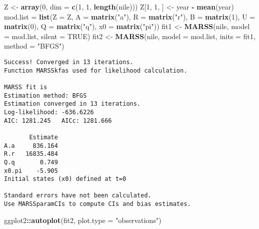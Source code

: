 \documentclass[12pt,]{book}
\newenvironment{Shaded}{\begin{snugshade}}{\end{snugshade}}
\newcommand{\DataTypeTok}[1]{\textcolor[rgb]{0.13,0.29,0.53}{#1}}
\newcommand{\DecValTok}[1]{\textcolor[rgb]{0.00,0.00,0.81}{#1}}
\newcommand{\KeywordTok}[1]{\textcolor[rgb]{0.13,0.29,0.53}{\textbf{#1}}}
\newcommand{\NormalTok}[1]{#1}
\newcommand{\OperatorTok}[1]{\textcolor[rgb]{0.81,0.36,0.00}{\textbf{#1}}}
\newcommand{\OtherTok}[1]{\textcolor[rgb]{0.56,0.35,0.01}{#1}}
\newcommand{\StringTok}[1]{\textcolor[rgb]{0.31,0.60,0.02}{#1}}
\begin{document}
\begin{Shaded}
\begin{Highlighting}[]
\NormalTok{Z <-}\StringTok{ }\KeywordTok{array}\NormalTok{(}\DecValTok{0}\NormalTok{, }\DataTypeTok{dim =} \KeywordTok{c}\NormalTok{(}\DecValTok{1}\NormalTok{, }\DecValTok{1}\NormalTok{, }\KeywordTok{length}\NormalTok{(nile)))}
\NormalTok{Z[}\DecValTok{1}\NormalTok{, }\DecValTok{1}\NormalTok{, ] <-}\StringTok{ }\NormalTok{year }\OperatorTok{-}\StringTok{ }\KeywordTok{mean}\NormalTok{(year)}
\NormalTok{mod.list =}\StringTok{ }\KeywordTok{list}\NormalTok{(}\DataTypeTok{Z =}\NormalTok{ Z, }\DataTypeTok{A =} \KeywordTok{matrix}\NormalTok{(}\StringTok{"a"}\NormalTok{), }\DataTypeTok{R =} \KeywordTok{matrix}\NormalTok{(}\StringTok{"r"}\NormalTok{), }\DataTypeTok{B =} \KeywordTok{matrix}\NormalTok{(}\DecValTok{1}\NormalTok{), }
    \DataTypeTok{U =} \KeywordTok{matrix}\NormalTok{(}\DecValTok{0}\NormalTok{), }\DataTypeTok{Q =} \KeywordTok{matrix}\NormalTok{(}\StringTok{"q"}\NormalTok{), }\DataTypeTok{x0 =} \KeywordTok{matrix}\NormalTok{(}\StringTok{"pi"}\NormalTok{))}
\NormalTok{fit1 <-}\StringTok{ }\KeywordTok{MARSS}\NormalTok{(nile, }\DataTypeTok{model =}\NormalTok{ mod.list, }\DataTypeTok{silent =} \OtherTok{TRUE}\NormalTok{)}
\NormalTok{fit2 <-}\StringTok{ }\KeywordTok{MARSS}\NormalTok{(nile, }\DataTypeTok{model =}\NormalTok{ mod.list, }\DataTypeTok{inits =}\NormalTok{ fit1, }\DataTypeTok{method =} \StringTok{"BFGS"}\NormalTok{)}
\end{Highlighting}
\end{Shaded}

\begin{verbatim}
Success! Converged in 13 iterations.
Function MARSSkfas used for likelihood calculation.

MARSS fit is
Estimation method: BFGS 
Estimation converged in 13 iterations. 
Log-likelihood: -636.6226 
AIC: 1281.245   AICc: 1281.666   
 
       Estimate
A.a     836.164
R.r   16835.484
Q.q       0.749
x0.pi    -5.905
Initial states (x0) defined at t=0

Standard errors have not been calculated. 
Use MARSSparamCIs to compute CIs and bias estimates.
\end{verbatim}

\begin{Shaded}
\begin{Highlighting}[]
\NormalTok{ggplot2}\OperatorTok{::}\KeywordTok{autoplot}\NormalTok{(fit2, }\DataTypeTok{plot.type =} \StringTok{"observations"}\NormalTok{)}
\end{Highlighting}
\end{Shaded}
\end{document}
